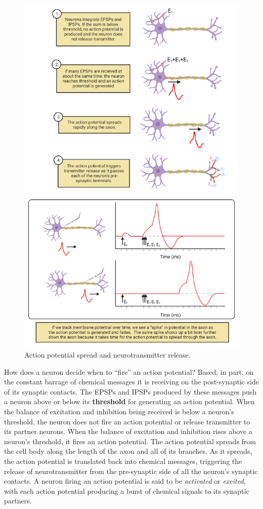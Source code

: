 \documentclass[
]{book}
\begin{document}
\begin{figure}

{\centering \includegraphics[width=0.9\linewidth]{images/ch02/02_04} 

}

\caption{Action potential spread and neurotransmitter release.}\label{fig:ch02-04}
\end{figure}

How does a neuron decide when to ``fire'' an action potential? Based, in part, on the constant barrage of chemical messages it is receiving on the post-synaptic side of its synaptic contacts. The EPSPs and IPSPs produced by these messages push a neuron above or below its \textbf{threshold} for generating an action potential. When the balance of excitation and inhibition being received is below a neuron's threshold, the neuron does not fire an action potential or release transmitter to its partner neurons. When the balance of excitation and inhibition rises above a neuron's threshold, it fires an action potential. The action potential spreads from the cell body along the length of the axon and all of its branches. As it spreads, the action potential is translated back into chemical messages, triggering the release of neurotransmitter from the pre-synaptic side of all the neuron's synaptic contacts. A neuron firing an action potential is said to be \emph{activated} or \emph{excited}, with each action potential producing a burst of chemical signals to its synaptic partners.
\end{document}
